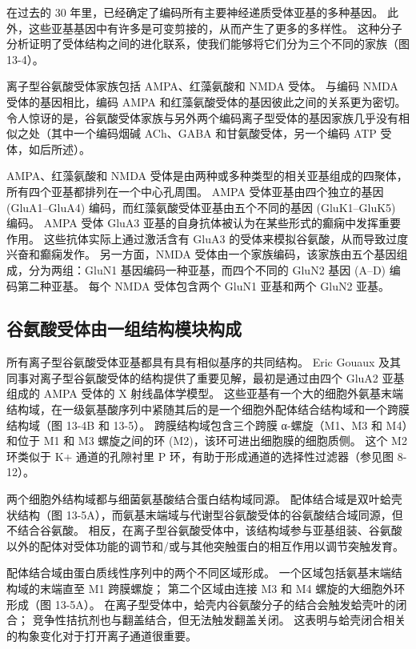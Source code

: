 在过去的 30 年里，已经确定了编码所有主要神经递质受体亚基的多种基因。 
此外，这些亚基基因中有许多是可变剪接的，从而产生了更多的多样性。 
这种分子分析证明了受体结构之间的进化联系，使我们能够将它们分为三个不同的家族（图 13-4）。


离子型谷氨酸受体家族包括 AMPA、红藻氨酸和 NMDA 受体。 
与编码 NMDA 受体的基因相比，编码 AMPA 和红藻氨酸受体的基因彼此之间的关系更为密切。 
令人惊讶的是，谷氨酸受体家族与另外两个编码离子型受体的基因家族几乎没有相似之处（其中一个编码烟碱 ACh、GABA 和甘氨酸受体，另一个编码 ATP 受体，如后所述）。


AMPA、红藻氨酸和 NMDA 受体是由两种或多种类型的相关亚基组成的四聚体，所有四个亚基都排列在一个中心孔周围。 
AMPA 受体亚基由四个独立的基因 (GluA1–GluA4) 编码，而红藻氨酸受体亚基由五个不同的基因 (GluK1–GluK5) 编码。
AMPA 受体 GluA3 亚基的自身抗体被认为在某些形式的癫痫中发挥重要作用。 
这些抗体实际上通过激活含有 GluA3 的受体来模拟谷氨酸，从而导致过度兴奋和癫痫发作。 
另一方面，NMDA 受体由一个家族编码，该家族由五个基因组成，分为两组：GluN1 基因编码一种亚基，而四个不同的 GluN2 基因 (A–D) 编码第二种亚基。 
每个 NMDA 受体包含两个 GluN1 亚基和两个 GluN2 亚基。




\subsection{谷氨酸受体由一组结构模块构成}

所有离子型谷氨酸受体亚基都具有具有相似基序的共同结构。
Eric Gouaux 及其同事对离子型谷氨酸受体的结构提供了重要见解，最初是通过由四个 GluA2 亚基组成的 AMPA 受体的 X 射线晶体学模型。 
这些亚基有一个大的细胞外氨基末端结构域，在一级氨基酸序列中紧随其后的是一个细胞外配体结合结构域和一个跨膜结构域（图 13-4B 和 13-5）。 
跨膜结构域包含三个跨膜 α-螺旋（M1、M3 和 M4）和位于 M1 和 M3 螺旋之间的环 (M2)，该环可进出细胞膜的细胞质侧。 
这个 M2 环类似于 K+ 通道的孔隙衬里 P 环，有助于形成通道的选择性过滤器（参见图 8-12）。


两个细胞外结构域都与细菌氨基酸结合蛋白结构域同源。 配体结合域是双叶蛤壳状结构（图 13-5A），而氨基末端域与代谢型谷氨酸受体的谷氨酸结合域同源，但不结合谷氨酸。 
相反，在离子型谷氨酸受体中，该结构域参与亚基组装、谷氨酸以外的配体对受体功能的调节和/或与其他突触蛋白的相互作用以调节突触发育。


配体结合域由蛋白质线性序列中的两个不同区域形成。 
一个区域包括氨基末端结构域的末端直至 M1 跨膜螺旋； 
第二个区域由连接 M3 和 M4 螺旋的大细胞外环形成（图 13-5A）。
在离子型受体中，蛤壳内谷氨酸分子的结合会触发蛤壳叶的闭合； 
竞争性拮抗剂也与翻盖结合，但无法触发翻盖关闭。 
这表明与蛤壳闭合相关的构象变化对于打开离子通道很重要。



